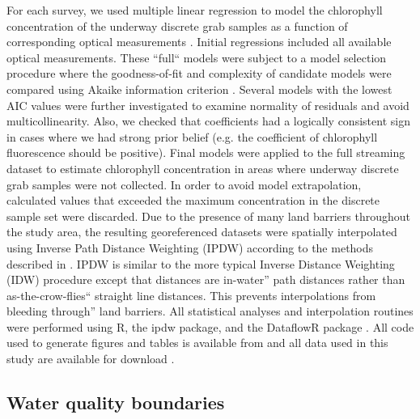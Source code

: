 \documentclass[review]{elsarticle}
\begin{document}
For each survey, we used multiple linear regression to model the chlorophyll concentration of the underway discrete grab samples as a function of corresponding optical measurements \citep{seppala_ship_opportunity_2007,seppala_multivariate_2008}. Initial regressions included all available optical measurements. These “full“ models were subject to a model selection procedure where the goodness-of-fit and complexity of candidate models were compared using Akaike information criterion \citep[AIC;][]{venables2002modern}. Several models with the lowest AIC values were further investigated to examine normality of residuals and avoid multicollinearity. Also, we checked that coefficients had a logically consistent sign in cases where we had strong prior belief (e.g. the coefficient of chlorophyll fluorescence should be positive). 
Final models were applied to the full streaming dataset to estimate chlorophyll concentration in areas where underway discrete grab samples were not collected. In order to avoid model extrapolation, calculated values that exceeded the maximum concentration in the discrete sample set were discarded. Due to the presence of many land barriers throughout the study area, the resulting georeferenced datasets were spatially interpolated using Inverse Path Distance Weighting (IPDW) according to the methods described in \citet{stachelek_application_2015}. IPDW is similar to the more typical Inverse Distance Weighting (IDW) procedure except that distances are in-water” path distances rather than as-the-crow-flies“ straight line distances. This prevents interpolations from bleeding through” land barriers. All statistical analyses and interpolation routines were performed using R, the ipdw package, and the DataflowR package \citep{rcore_2015}. All code used to generate figures and tables is available from and all data used in this study are available for download .

\subsection{Water quality boundaries}
\end{document}

